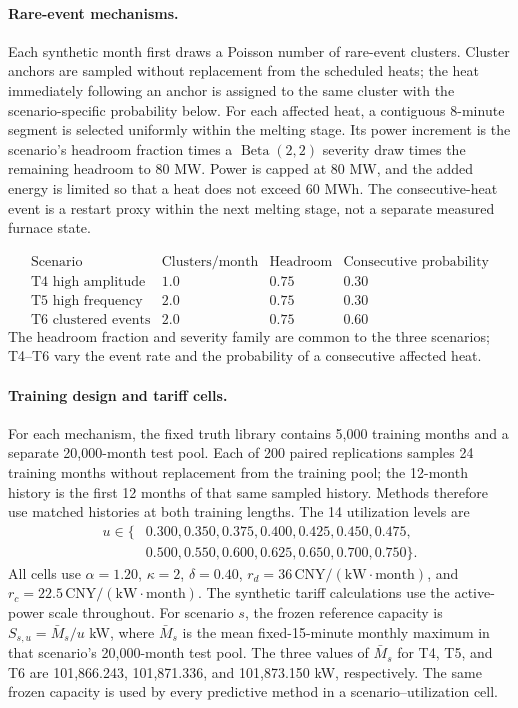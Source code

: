 \documentclass[]{interact}
\begin{document}
\paragraph*{Rare-event mechanisms.}
Each synthetic month first draws a Poisson number of rare-event
clusters. Cluster anchors are sampled without replacement from the
scheduled heats; the heat immediately following an anchor is assigned
to the same cluster with the scenario-specific probability below.
For each affected heat, a contiguous 8-minute segment is selected
uniformly within the melting stage. Its power increment is the
scenario's headroom fraction times a $\operatorname{Beta}(2,2)$ severity
draw times the remaining headroom to 80 MW. Power is capped at 80 MW,
and the added energy is limited so that a heat does not exceed 60 MWh.
The consecutive-heat event is a restart proxy within the next melting
stage, not a separate measured furnace state.

\[
\begin{array}{lccc}
\text{Scenario} & \text{Clusters/month} &
\text{Headroom} & \text{Consecutive probability}\\
\text{T4 high amplitude} & 1.0 & 0.75 & 0.30\\
\text{T5 high frequency} & 2.0 & 0.75 & 0.30\\
\text{T6 clustered events} & 2.0 & 0.75 & 0.60
\end{array}
\]
The headroom fraction and severity family are common to the three
scenarios; T4--T6 vary the event rate and the probability of a
consecutive affected heat.

\paragraph*{Training design and tariff cells.}
For each mechanism, the fixed truth library contains 5,000 training
months and a separate 20,000-month test pool. Each of 200 paired
replications samples 24 training months without replacement from the
training pool; the 12-month history is the first 12 months of that
same sampled history. Methods therefore use matched histories at both
training lengths. The 14 utilization levels are
\[
\begin{aligned}u\in\{&0.300,0.350,0.375,0.400,0.425,0.450,0.475,\\
&0.500,0.550,0.600,0.625,0.650,0.700,0.750\}.\end{aligned}
\]
All cells use $\alpha=1.20$, $\kappa=2$, $\delta=0.40$,
$r_d=36\,\mathrm{CNY/(kW\cdot month)}$, and
$r_c=22.5\,\mathrm{CNY/(kW\cdot month)}$. The synthetic tariff
calculations use the active-power scale throughout. For scenario $s$,
the frozen reference capacity is $S_{s,u}=\bar M_s/u$ kW, where
$\bar M_s$ is the mean fixed-15-minute monthly maximum in that
scenario's 20,000-month test pool. The three values of $\bar M_s$ for
T4, T5, and T6 are 101,866.243, 101,871.336, and 101,873.150 kW,
respectively. The same frozen capacity is used by every predictive
method in a scenario--utilization cell.
\end{document}
